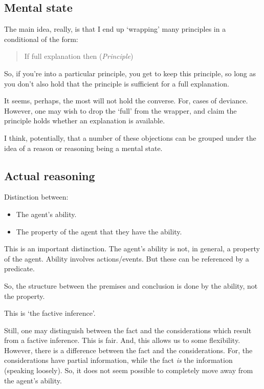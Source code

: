 \documentclass[10pt]{article}
\begin{document}
\subsection{Mental state}
\label{sec:mental-state}

{
  \color{red}
  The main idea, really, is that I end up `wrapping' many principles in a conditional of the form:
  \begin{quote}
    If full explanation then (\emph{Principle})
  \end{quote}
  So, if you're into a particular principle, you get to keep this principle, so long as you don't also hold that the principle is sufficient for a full explanation.

  It seems, perhaps, the most will not hold the converse.
  For, cases of deviance.
  However, one may wish to drop the `full' from the wrapper, and claim the principle holds whether an explanation is available.
}

I think, potentially, that a number of these objections can be grouped under the idea of a reason or reasoning being a mental state.

\subsection{Actual reasoning}
\label{sec:actual-reasoning}

\begin{note}[Ability]
  Distinction between:
  \begin{itemize}
  \item The agent's ability.
  \item The property of the agent that they have the ability.
  \end{itemize}
  This is an important distinction.
  The agent's ability is not, in general, a property of the agent.
  Ability involves actions/events.
  But these can be referenced by a predicate.

  So, the structure between the premises and conclusion is done by the ability, not the property.

  This is `the factive inference'.

  Still, one may distinguish between the fact and the considerations which result from a factive inference.
  This is fair.
  And, this allows us to some flexibility.
  However, there is a difference between the fact and the considerations.
  For, the considerations have partial information, while the fact \emph{is} the information (speaking loosely).
  So, it does not seem possible to completely move away from the agent's ability.
\end{note}
\end{document}
